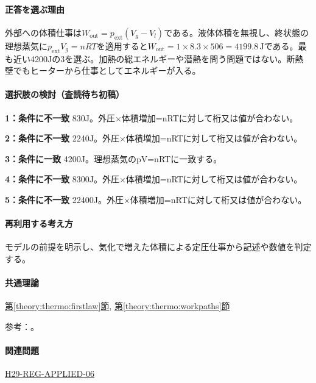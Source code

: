 \paragraph{正答を選ぶ理由} 外部への体積仕事は\(W_{\mathrm{out}}=p_{\mathrm{ext}}(V_g-V_l)\)である。液体体積を無視し、終状態の理想蒸気に\(p_{\mathrm{ext}}V_g=nRT\)を適用すると\(W_{\mathrm{out}}=1\times8.3\times506=4199.8\,\mathrm{J}\)である。最も近い4200Jの3を選ぶ。加熱の総エネルギーや潜熱を問う問題ではない。断熱壁でもヒーターから仕事としてエネルギーが入る。

\paragraph{選択肢の検討（査読待ち初稿）}\mbox{}\par

\noindent\textbf{1：条件に不一致} 830J。外圧×体積増加=nRTに対して桁又は値が合わない。\par

\noindent\textbf{2：条件に不一致} 2240J。外圧×体積増加=nRTに対して桁又は値が合わない。\par

\noindent\textbf{3：条件に一致} 4200J。理想蒸気のpV=\allowbreak{}nRTに一致する。\par

\noindent\textbf{4：条件に不一致} 8300J。外圧×体積増加=nRTに対して桁又は値が合わない。\par

\noindent\textbf{5：条件に不一致} 22400J。外圧×体積増加=nRTに対して桁又は値が合わない。\par

\paragraph{再利用する考え方} モデルの前提を明示し、気化で増えた体積による定圧仕事から記述や数値を判定する。

\paragraph{共通理論} \hyperref[theory:thermo:firstlaw]{第\ref*{theory:thermo:firstlaw}節}, \hyperref[theory:thermo:workpaths]{第\ref*{theory:thermo:workpaths}節}

\par 参考：\cite{mit_thermo_firstlaw2008}。

\paragraph{関連問題} \hyperref[q:h29-reg-applied-06]{H29-REG-APPLIED-06}

